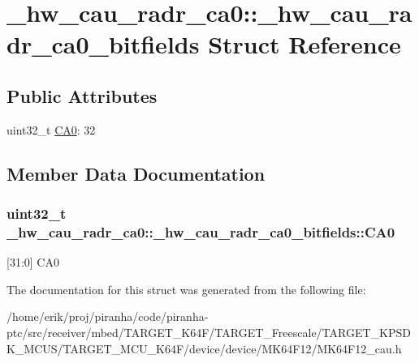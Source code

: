 \hypertarget{struct__hw__cau__radr__ca0_1_1__hw__cau__radr__ca0__bitfields}{}\section{\+\_\+hw\+\_\+cau\+\_\+radr\+\_\+ca0\+:\+:\+\_\+hw\+\_\+cau\+\_\+radr\+\_\+ca0\+\_\+bitfields Struct Reference}
\label{struct__hw__cau__radr__ca0_1_1__hw__cau__radr__ca0__bitfields}
\subsection*{Public Attributes}
\begin{DoxyCompactItemize}
\item 
uint32\+\_\+t \hyperlink{struct__hw__cau__radr__ca0_1_1__hw__cau__radr__ca0__bitfields_ae49d6ff57041b6e673cb5fa9b85a1fb8}{C\+A0}\+: 32
\end{DoxyCompactItemize}


\subsection{Member Data Documentation}
\subsubsection[{\texorpdfstring{C\+A0}{CA0}}]{\setlength{\rightskip}{0pt plus 5cm}uint32\+\_\+t \+\_\+hw\+\_\+cau\+\_\+radr\+\_\+ca0\+::\+\_\+hw\+\_\+cau\+\_\+radr\+\_\+ca0\+\_\+bitfields\+::\+C\+A0}\hypertarget{struct__hw__cau__radr__ca0_1_1__hw__cau__radr__ca0__bitfields_ae49d6ff57041b6e673cb5fa9b85a1fb8}{}\label{struct__hw__cau__radr__ca0_1_1__hw__cau__radr__ca0__bitfields_ae49d6ff57041b6e673cb5fa9b85a1fb8}
\mbox{[}31\+:0\mbox{]} C\+A0 

The documentation for this struct was generated from the following file\+:\begin{DoxyCompactItemize}
\item 
/home/erik/proj/piranha/code/piranha-\/ptc/src/receiver/mbed/\+T\+A\+R\+G\+E\+T\+\_\+\+K64\+F/\+T\+A\+R\+G\+E\+T\+\_\+\+Freescale/\+T\+A\+R\+G\+E\+T\+\_\+\+K\+P\+S\+D\+K\+\_\+\+M\+C\+U\+S/\+T\+A\+R\+G\+E\+T\+\_\+\+M\+C\+U\+\_\+\+K64\+F/device/device/\+M\+K64\+F12/M\+K64\+F12\+\_\+cau.\+h\end{DoxyCompactItemize}
